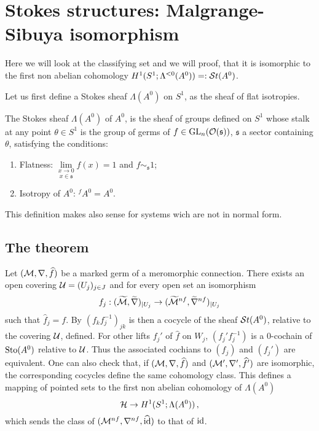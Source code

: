 \section{Stokes structures: Malgrange-Sibuya isomorphism}\label{sec:mainThm1}
\begin{comment}
  \cite[Thm.I.2.1]{Loday1994}, \cite[Thm.4.3.9]{Loday2014} and
  \cite[Thm.II.6.2]{sabbah2007isomonodromic}
\end{comment}
Here we will look at the classifying set and we will proof, that it is
isomorphic \TODO[as\dots] to the first non abelian cohomology 
$H^1(S^1;\Lambda^{<0}(A^0))=:\mathcal{S}{}t(A^0)$.

Let us first define a Stokes sheaf $\Lambda(A^0)$ on $S^1$, as the sheaf of
flat isotropies.
\begin{defn} \label{defn:StokesSheaf}
  The Stokes sheaf $\Lambda(A^0)$ of $A^0$, is the sheaf of groups defined on
  $S^1$ whose stalk at any point $\theta\in S^1$ is the group of germs of
  $f\in\operatorname{GL}_n(\mathcal{O}(\mathfrak{s}))$, $\mathfrak{s}$ a sector containing $\theta$, satisfying
  the conditions:
  \begin{enumerate}
    \item Flatness: $\underset{x\in\mathfrak{s}}{\underset{x\to0}{\lim}}f(x)=1$
      and $f\sim_{\mathfrak{s}} 1$;
    \item Isotropy of $A^0$: ${}^f\!A^0=A^0$.
  \end{enumerate}
  \begin{s-rem}
    This definition makes also sense for systems wich are not in normal form.
  \end{s-rem}
  \begin{comment}
    \begin{s-rem}
      $\Lambda(A^0)$ is the same as $\Aut^{<0}(\tilde\cM^{nf})$
      in~\cite{sabbah2007isomonodromic} which is defined as follows \TODO
    \end{s-rem}
  \end{comment}
\end{defn}

\subsection{The theorem}
Let $(\mathcal{M},\nabla,\widehat f)$ be a marked germ of a  meromorphic connection.
There exists an open covering $\mathcal{U}=(U_j)_{j\in J}$ and for every open set an
isomorphism
\[
  f_j:(\widetilde{\mathcal{M}},\widetilde\nabla)_{|U_j}
  \to(\widetilde{\mathcal{M}}^{nf},\widetilde\nabla^{nf})_{|U_j}
\]
such that $\hat f_j=f$. By $(f_kf_j^{-1})_{jk}$ is then a cocycle of the
sheaf $\mathcal{S}{}t(A^0)$, relative to the covering $\mathcal{U}$, defined.
For other lifts $f_j'$ of $\hat f$ on $W_j$, $(f_j'f_j^{-1})$ is a $0$-cochain
of $\operatorname{Sto}(A^0)$ relative to $\mathcal{U}$. Thus the associated cochians to $(f_j)$ and
$(f_j')$ are equivalent. One can also check that, if $(\mathcal{M},\nabla,\widehat f)$ and
$(\mathcal{M}',\nabla',\widehat f')$ are isomorphic, the corresponding cocycles define the
same cohomology class. This defines a mapping of pointed sets
to the first non abelian cohomology of $\Lambda(A^0)$
\[
  \mathcal{H}\to H^1(S^1;\Lambda(A^0)) \,,
\]
which sends the class of $(\mathcal{M}^{nf},\nabla^{nf},\widehat{\operatorname{id}})$ to that of
$\operatorname{id}$.

